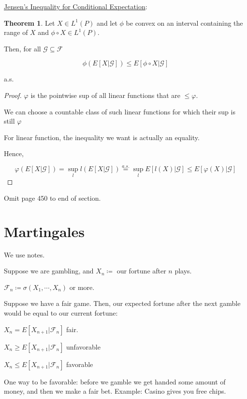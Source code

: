 \documentclass{article}
\theoremstyle{definition}
\newtheorem{theorem}{Theorem}
\begin{document}
\underline{Jensen's Inequality for Conditional Expectation}:

\begin{theorem}

    Let \(X\in L^1(P)\) and let \(\phi\) be convex on an interval containing the range of \(X\) and \(\phi \circ X \in L^1(P)\).

    Then, for all \(\mathscr{G} \subseteq \mathscr{F}\) 

    \[
        \phi (E[X|\mathscr{G}]) \leq E[\phi \circ X | \mathscr{G} ]
    \]

    a.s.

\end{theorem}

\begin{proof}
    \(\varphi\) is the pointwise sup of all linear functions that are \(\leq \varphi\).

    We can choose a countable class of such linear functions for which their sup is still \(\varphi\) 

    For linear function, the inequality we want is actually an equality.

    Hence,

    \[
        \varphi (E[X|\mathscr{G}]) = \sup_l l(E[X|\mathscr{G}]) \overset{a.s.}{=}  \sup_l E[l(X)|\mathscr{G}] \leq E[\varphi(X)|\mathscr{G}]
    \]

\end{proof}

Omit page 450 to end of section.

\section*{Martingales}

We use notes.

Suppose we are gambling, and \(X_n \coloneqq \) our fortune after \(n\) plays.

\(\mathscr{F}_n \coloneqq \sigma(X_1,\cdots, X_n)\) or more.

Suppose we have a fair game. Then, our expected fortune after the next gamble would be equal to our current fortune:

\(X_n = E[X_{n+1}| \mathscr{F}_n]\) fair.

\(X_n \geq E[X_{n+1}| \mathscr{F}_n]\) unfavorable

\(X_n \leq E[X_{n+1}|\mathscr{F}_n]\) favorable

One way to be favorable: before we gamble we get handed some amount of money, and then we make a fair bet. Example: Casino gives you free chips.
\end{document}
